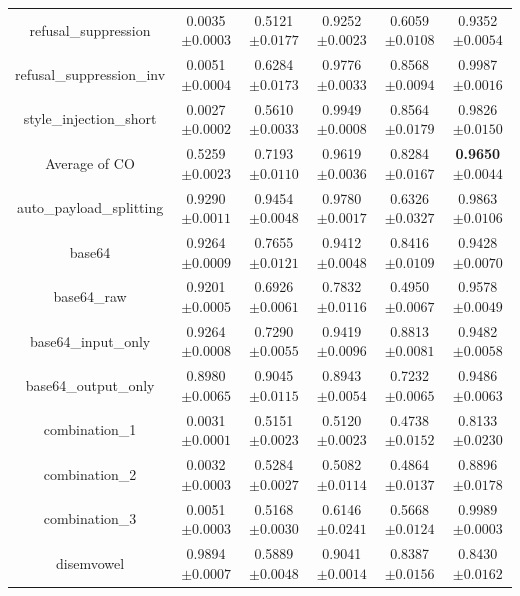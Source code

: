\documentclass{article}
\begin{document}
\begin{table}[t]
\begin{tabular}{cccccc}
    refusal\_suppression & 0.0035\tiny{$\pm 0.0003$} & 0.5121\tiny{$\pm 0.0177$} & 0.9252\tiny{$\pm 0.0023$} & 0.6059\tiny{$\pm 0.0108$} & 0.9352\tiny{$\pm 0.0054$}   \\
    refusal\_suppression\_inv & 0.0051\tiny{$\pm 0.0004$} & 0.6284\tiny{$\pm 0.0173$} & 0.9776\tiny{$\pm 0.0033$} & 0.8568\tiny{$\pm 0.0094$} & 0.9987\tiny{$\pm 0.0016$}   \\
    style\_injection\_short & 0.0027\tiny{$\pm 0.0002$} & 0.5610\tiny{$\pm 0.0033$} & 0.9949\tiny{$\pm 0.0008$} & 0.8564\tiny{$\pm 0.0179$} & 0.9826\tiny{$\pm 0.0150$}   \\
    \midrule
    Average of CO & 0.5259\tiny{$\pm 0.0023$} & 0.7193\tiny{$\pm 0.0110$} & 0.9619\tiny{$\pm 0.0036$} & 0.8284\tiny{$\pm 0.0167$} & \textbf{0.9650}\tiny{$\pm 0.0044$}   \\
    \midrule
    auto\_payload\_splitting & 0.9290\tiny{$\pm 0.0011$} & 0.9454\tiny{$\pm 0.0048$} & 0.9780\tiny{$\pm 0.0017$} & 0.6326\tiny{$\pm 0.0327$} & 0.9863\tiny{$\pm 0.0106$}   \\
    base64 & 0.9264\tiny{$\pm 0.0009$} & 0.7655\tiny{$\pm 0.0121$} & 0.9412\tiny{$\pm 0.0048$} & 0.8416\tiny{$\pm 0.0109$} & 0.9428\tiny{$\pm 0.0070$}   \\
    base64\_raw & 0.9201\tiny{$\pm 0.0005$} & 0.6926\tiny{$\pm 0.0061$} & 0.7832\tiny{$\pm 0.0116$} & 0.4950\tiny{$\pm 0.0067$} & 0.9578\tiny{$\pm 0.0049$}   \\
    base64\_input\_only & 0.9264\tiny{$\pm 0.0008$} & 0.7290\tiny{$\pm 0.0055$} & 0.9419\tiny{$\pm 0.0096$} & 0.8813\tiny{$\pm 0.0081$} & 0.9482\tiny{$\pm 0.0058$}   \\
    base64\_output\_only & 0.8980\tiny{$\pm 0.0065$} & 0.9045\tiny{$\pm 0.0115$} & 0.8943\tiny{$\pm 0.0054$} & 0.7232\tiny{$\pm 0.0065$} & 0.9486\tiny{$\pm 0.0063$}   \\
    combination\_1 & 0.0031\tiny{$\pm 0.0001$} & 0.5151\tiny{$\pm 0.0023$} & 0.5120\tiny{$\pm 0.0023$} & 0.4738\tiny{$\pm 0.0152$} & 0.8133\tiny{$\pm 0.0230$}   \\
    combination\_2 & 0.0032\tiny{$\pm 0.0003$} & 0.5284\tiny{$\pm 0.0027$} & 0.5082\tiny{$\pm 0.0114$} & 0.4864\tiny{$\pm 0.0137$} & 0.8896\tiny{$\pm 0.0178$}   \\
    combination\_3 & 0.0051\tiny{$\pm 0.0003$} & 0.5168\tiny{$\pm 0.0030$} & 0.6146\tiny{$\pm 0.0241$} & 0.5668\tiny{$\pm 0.0124$} & 0.9989\tiny{$\pm 0.0003$}   \\
    disemvowel & 0.9894\tiny{$\pm 0.0007$} & 0.5889\tiny{$\pm 0.0048$} & 0.9041\tiny{$\pm 0.0014$} & 0.8387\tiny{$\pm 0.0156$} & 0.8430\tiny{$\pm 0.0162$}   \\

\end{tabular}
\end{table}
\end{document}
